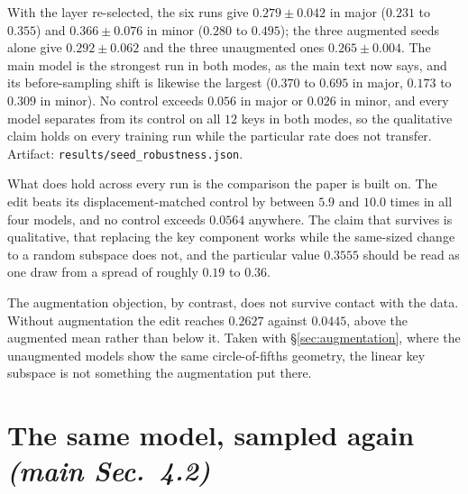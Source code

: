 \documentclass{article}
\begin{document}
With the layer re-selected, the six runs give $0.279 \pm 0.042$ in major ($0.231$ to
$0.355$) and $0.366 \pm 0.076$ in minor ($0.280$ to $0.495$); the three augmented seeds
alone give $0.292 \pm 0.062$ and the three unaugmented ones $0.265 \pm 0.004$. The main
model is the strongest run in both modes, as the main text now says, and its
before-sampling shift is likewise the largest ($0.370$ to $0.695$ in major, $0.173$ to
$0.309$ in minor). No control exceeds $0.056$ in major or $0.026$ in minor, and every
model separates from its control on all $12$ keys in both modes, so the qualitative claim
holds on every training run while the particular rate does not transfer. Artifact:
\texttt{results/seed\_robustness.json}.

What does hold across every run is the comparison the paper is built on. The edit beats
its displacement-matched control by between $5.9$ and $10.0$ times in all four models,
and no control exceeds $0.0564$ anywhere. The claim that survives is qualitative, that
replacing the key component works while the same-sized change to a random subspace does
not, and the particular value $0.3555$ should be read as one draw from a spread of
roughly $0.19$ to $0.36$.

The augmentation objection, by contrast, does not survive contact with the data.
Without augmentation the edit reaches $0.2627$ against $0.0445$, above the augmented
mean rather than below it. Taken with \S\ref{sec:augmentation}, where the unaugmented
models show the same circle-of-fifths geometry, the linear key subspace is not
something the augmentation put there.

\section{The same model, sampled again \normalfont\textit{(main Sec.~4.2)}}
\label{sec:gen-seed}
%
\end{document}
